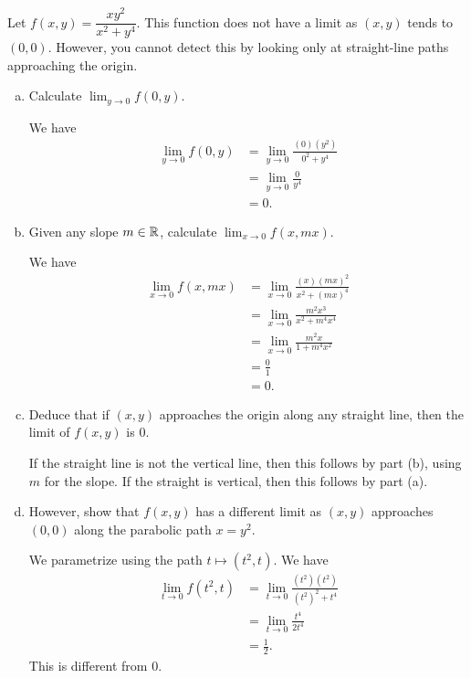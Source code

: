 \begin{problem}
  Let $f(x,y)=\dfrac{xy^2}{x^2+y^4}$. This function does not have a limit as $(x,y)$ tends to $(0,0)$. However, you cannot detect this by looking only at straight-line paths approaching the origin.
  \begin{enumerate}[(a)]
    \item Calculate $\lim_{y\to 0}f(0,y)$.
    \begin{solution}
      We have
      \[\begin{split}
        \lim_{y\to 0}f(0,y) &= \lim_{y\to 0}\frac{(0)(y^2)}{0^2+y^4}\\
        &= \lim_{y\to 0}\frac{0}{y^4}\\
        &= 0.
      \end{split}\]
    \end{solution}
    \item Given any slope $m\in\mathbb R$, calculate $\lim_{x\to 0}f(x,mx)$.
    \begin{solution}
      We have
      \[\begin{split}
        \lim_{x\to 0}f(x,mx) &= \lim_{x\to 0}\frac{(x)(mx)^2}{x^2+(mx)^4}\\
        &= \lim_{x\to 0}\frac{m^2x^3}{x^2+m^4x^4}\\
        &= \lim_{x\to 0}\frac{m^2x}{1+m^4x^2}\\
        &= \frac{0}{1}\\
        &= 0.
      \end{split}\]
    \end{solution}
    \item Deduce that if $(x,y)$ approaches the origin along any straight line, then the limit of $f(x,y)$ is 0.
    \begin{solution}
      If the straight line is not the vertical line, then this follows by part (b), using $m$ for the slope. If the straight is vertical, then this follows by part (a).
    \end{solution}
    \item However, show that $f(x,y)$ has a different limit as $(x,y)$ approaches $(0,0)$ along the parabolic path $x=y^2$.
    \begin{solution}
      We parametrize using the path $t\mapsto(t^2,t)$.
      We have
      \[\begin{split}
        \lim_{t\to 0}f(t^2,t) &= \lim_{t\to 0}\frac{(t^2)(t^2)}{(t^2)^2+t^4}\\
        &= \lim_{t\to 0}\frac{t^4}{2t^4}\\
        &= \frac12.
      \end{split}\]
      This is different from 0.
    \end{solution}
  \end{enumerate}
\end{problem}

